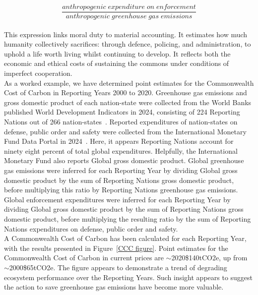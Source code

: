 \documentclass[12pt, oneside]{article}   	%
\begin{document}
\begin{equation}
	\frac{anthropogenic\; expenditure\; on\; enforcement}{anthropogenic\; greenhouse\; gas\; emissions}
\end{equation}\\

This expression links moral duty to material accounting.
It estimates how much humanity collectively sacrifices: through defence, policing, and administration, to uphold a life worth living whilst continuing to develop.
It reflects both the economic and ethical costs of sustaining the commons under conditions of imperfect cooperation.\\

As a worked example, we have determined point estimates for the Commonwealth Cost of Carbon in Reporting Years 2000 to 2020.
Greenhouse gas emissions and gross domestic product of each nation-state were collected from the World Banks published World Development Indicators in 2024, consisting of 224 Reporting Nations out of 266 nation-states~\cite{wbank}.
Reported expenditures of nation-states on defense, public order and safety were collected from the International Monetary Fund Data Portal in 2024~\cite{imf}.
Here, it appears Reporting Nations account for ninety eight percent of total global expenditures.
Helpfully, the International Monetary Fund also reports Global gross domestic product.
Global greenhouse gas emissions were inferred for each Reporting Year by dividing Global gross domestic product by the sum of Reporting Nations gross domestic product, before multiplying this ratio by Reporting Nations greenhouse gas emissions.
Global enforcement expenditures were inferred for each Reporting Year by dividing Global gross domestic product by the sum of Reporting Nations gross domestic product, before multiplying the resulting ratio by the sum of Reporting Nations expenditures on defense, public order and safety.\\

A Commonwealth Cost of Carbon has been calculated for each Reporting Year, with the results presented in Figure~\ref{CCC figure}.
Point estimates for the Commonwealth Cost of Carbon in current prices are $\sim$2020\$140tCO2e, up from $\sim$2000\$65tCO2e.
The figure appears to demonstrate a trend of degrading ecosystem performance over the Reporting Years.
Such insight appears to suggest the action to save greenhouse gas emissions have become more valuable.\\
\end{document}
